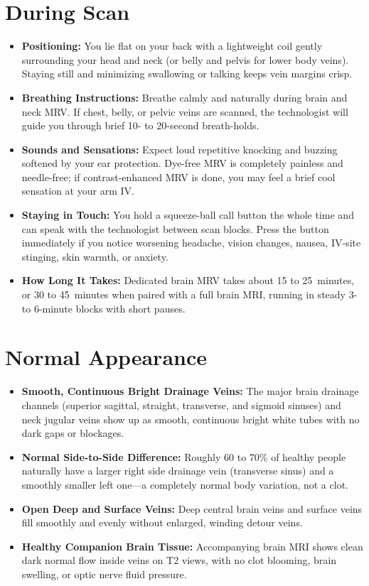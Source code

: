 \section{During Scan}
\begin{itemize}
\item \textbf{Positioning:} You lie flat on your back with a lightweight coil gently surrounding your head and neck (or belly and pelvis for lower body veins). Staying still and minimizing swallowing or talking keeps vein margins crisp.
\item \textbf{Breathing Instructions:} Breathe calmly and naturally during brain and neck MRV. If chest, belly, or pelvic veins are scanned, the technologist will guide you through brief 10- to 20-second breath-holds.
\item \textbf{Sounds and Sensations:} Expect loud repetitive knocking and buzzing softened by your ear protection. Dye-free MRV is completely painless and needle-free; if contrast-enhanced MRV is done, you may feel a brief cool sensation at your arm IV.
\item \textbf{Staying in Touch:} You hold a squeeze-ball call button the whole time and can speak with the technologist between scan blocks. Press the button immediately if you notice worsening headache, vision changes, nausea, IV-site stinging, skin warmth, or anxiety.
\item \textbf{How Long It Takes:} Dedicated brain MRV takes about 15 to 25~minutes, or 30 to 45~minutes when paired with a full brain MRI, running in steady 3- to 6-minute blocks with short pauses.
\end{itemize}

\section{Normal Appearance}
\begin{itemize}
\item \textbf{Smooth, Continuous Bright Drainage Veins:} The major brain drainage channels (superior sagittal, straight, transverse, and sigmoid sinuses) and neck jugular veins show up as smooth, continuous bright white tubes with no dark gaps or blockages.
\item \textbf{Normal Side-to-Side Difference:} Roughly 60 to 70\% of healthy people naturally have a larger right side drainage vein (transverse sinus) and a smoothly smaller left one---a completely normal body variation, not a clot.
\item \textbf{Open Deep and Surface Veins:} Deep central brain veins and surface veins fill smoothly and evenly without enlarged, winding detour veins.
\item \textbf{Healthy Companion Brain Tissue:} Accompanying brain MRI shows clean dark normal flow inside veins on T2 views, with no clot blooming, brain swelling, or optic nerve fluid pressure.
\end{itemize}

